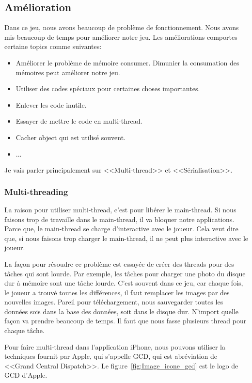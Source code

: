 \subsection{Amélioration} %
\label{sub:amélioration}

Dans ce jeu, nous avons beaucoup de problème de fonctionnement. Nous avons mis beaucoup de temps pour améliorer notre jeu. Les améliorations comportes certaine topics comme suivantes:

\begin{itemize}
	\item Améliorer le problème de mémoire consumer. Dimunier la consumation des mémoires peut améliorer notre jeu. 
	\item Utiliser des codes spéciaux pour certaines choses importantes.
	\item Enlever les code inutile.
	\item Essayer de mettre le code en multi-thread.
	\item Cacher object qui est utilisé souvent.
	\item ...
\end{itemize}

Je vais parler principalement sur <<Multi-thread>> et <<Sérialisation>>.

\subsubsection{Multi-threading} %
\label{ssub:multi_thread}

La raison pour utiliser multi-thread, c'est pour libérer le main-thread. Si nous faisons trop de travaille dans le main-thread, il va bloquer notre applications. Parce que, le main-thread se charge d'interactive avec le joueur. Cela veut dire que, si nous faisons trop charger le main-thread, il ne peut plus interactive avec le joueur. 

La façon pour résoudre ce problème est essayée de créer des threads pour des tâches qui sont lourde. Par exemple, les tâches pour charger une photo du disque dur à mémoire sont une tâche lourde. C'est souvent dans ce jeu, car chaque fois, le joueur a trouvé toutes les différences, il faut remplacer les images par des nouvelles images. Pareil pour téléchargement, nous sauvegarder toutes les données sois dans la base des données, soit dans le disque dur. N'import quelle façon va prendre beaucoup de temps. Il faut que nous fasse plusieurs thread pour chaque tâche.

Pour faire multi-thread dans l'application iPhone, nous pouvons utiliser la techniques fournit par Apple, qui s'appelle GCD, qui est abréviation de <<Grand Central Dispatch>>. Le figure~\ref{fig:Image_icone_gcd} est le logo de GCD d'Apple.

